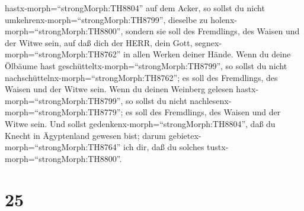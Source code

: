 hastx-morph=``strongMorph:TH8804'' auf dem Acker, so sollst du nicht
umkehrenx-morph=``strongMorph:TH8799'', dieselbe zu
holenx-morph=``strongMorph:TH8800'', sondern sie soll des Fremdlings,
des Waisen und der Witwe sein, auf daß dich der HERR, dein Gott,
segnex-morph=``strongMorph:TH8762'' in allen Werken deiner Hände.
 Wenn du deine Ölbäume hast
geschütteltx-morph=``strongMorph:TH8799'', so sollst du nicht
nachschüttelnx-morph=``strongMorph:TH8762''; es soll des Fremdlings, des
Waisen und der Witwe sein.  Wenn du deinen Weinberg gelesen
hastx-morph=``strongMorph:TH8799'', so sollst du nicht
nachlesenx-morph=``strongMorph:TH8779''; es soll des Fremdlings, des
Waisen und der Witwe sein.  Und sollst
gedenkenx-morph=``strongMorph:TH8804'', daß du Knecht in Ägyptenland
gewesen bist; darum gebietex-morph=``strongMorph:TH8764'' ich dir, daß
du solches tustx-morph=``strongMorph:TH8800''.

\hypertarget{section-24}{%
\section{25}\label{section-24}}

